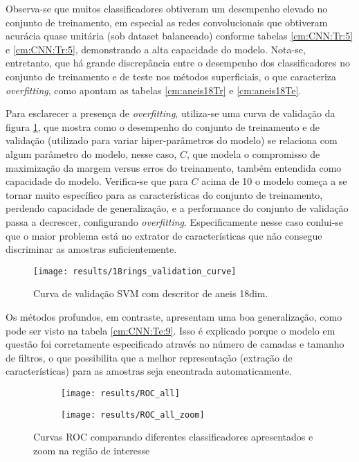 Observa-se que muitos classificadores obtiveram um desempenho elevado no conjunto de treinamento, em especial as redes convolucionais que obtiveram acurácia quase unitária (sob dataset balanceado) conforme tabelas \ref{cm:CNN:Tr:5} e \ref{cm:CNN:Tr:5}, demonstrando a alta capacidade do modelo. Nota-se, entretanto, que há grande discrepância entre o desempenho dos classificadores no conjunto de treinamento e de teste nos métodos superficiais, o que caracteriza \textit{overfitting}, como apontam as tabelas \ref{cm:aneis18Tr} e \ref{cm:aneis18Te}. 

Para esclarecer a presença de \textit{overfitting}, utiliza-se uma curva de validação da figura \ref{fig:validation-curve}, que mostra como o desempenho do conjunto de treinamento e de validação (utilizado para variar hiper-parâmetros do modelo) se relaciona com algum parâmetro do modelo, nesse caso, $C$, que modela o compromisso de maximização da margem versus erros do treinamento, também entendida como capacidade do modelo. Verifica-se que para $C$ acima de 10 o modelo começa a se tornar muito específico para as características do conjunto de treinamento, perdendo capacidade de generalização, e a performance do conjunto de validação passa a decrescer, configurando \textit{overfitting}. Especificamente nesse caso conlui-se que o maior problema está no extrator de características que não consegue discriminar as amostras suficientemente.

\begin{figure}
  \centering
  \texttt{[image: results/18rings\_validation\_curve]}
  \caption{Curva de validação SVM com descritor de aneis 18dim.}
  \label{fig:validation-curve}
\end{figure}

Os métodos profundos, em contraste, apresentam uma boa generalização, como pode ser visto na tabela \ref{cm:CNN:Te:9}. Isso é explicado porque o modelo em questão foi corretamente especificado através no número de camadas e tamanho de filtros, o que possibilita que a melhor representação (extração de características) para as amostras seja encontrada automaticamente.

\begin{figure}
\centering
\begin{subfigure}{.5\textwidth}
  \centering
  \texttt{[image: results/ROC\_all]}
\end{subfigure}%
\begin{subfigure}{.5\textwidth}
  \centering
  \texttt{[image: results/ROC\_all\_zoom]}
\end{subfigure}
\caption{Curvas ROC comparando diferentes classificadores apresentados e zoom na região de interesse}
\label{fig:ROC}
\end{figure}

